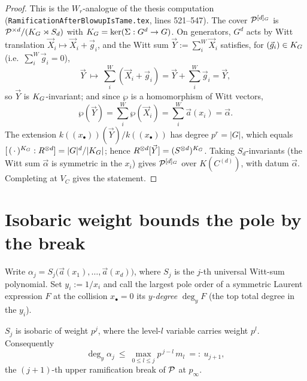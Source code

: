 \documentclass[11pt]{article}
\begin{document}
\begin{proof}
This is the $W_r$-analogue of the thesis computation
(\texttt{RamificationAfterBlowupIsTame.tex}, lines 521--547). The cover
$\mathcal{P}^{[d]_G}$ is $\mathcal{P}^{\times d}/(K_{G}\rtimes S_d)$ with
$K_{G}=\ker(\Sigma:G^d\to G)$. On generators, $G^d$ acts by Witt translation
$\vec X_i\mapsto \vec X_i+\vec g_i$, and the Witt sum $\vec Y:=\sum_i^{W}\vec X_i$
satisfies, for $(\vec g_i)\in K_{G}$ (i.e.\ $\sum_i^{W}\vec g_i=0$),
\[
\vec Y\ \longmapsto\ \sum_i^{W}(\vec X_i+\vec g_i)=\vec Y+\sum_i^{W}\vec g_i=\vec Y,
\]
so $\vec Y$ is $K_{G}$-invariant; and since $\wp$ is a homomorphism of Witt
vectors,
\[
\wp(\vec Y)=\sum_i^{W}\wp(\vec X_i)=\sum_i^{W}\vec a(x_i)=\vec\alpha .
\]
The extension $k((x_\bullet))(\vec Y)/k((x_\bullet))$ has degree $p^r=|G|$,
which equals $[\,(\,\cdot\,)^{K_{G}}:R^{\otimes d}]=|G|^d/|K_{G}|$; hence
$R^{\otimes d}[\vec Y]=(S^{\otimes d})^{K_{G}}$. Taking $S_d$-invariants (the Witt
sum $\vec\alpha$ is symmetric in the $x_i$) gives $\mathcal{P}^{[d]_G}$ over
$K(C^{(d)})$, with datum $\vec\alpha$. Completing at $V_C$ gives the statement.
\end{proof}

\section{Isobaric weight bounds the pole by the break}\label{sec:isobaric}

Write $\alpha_j=S_j\big(\vec a(x_1),\dots,\vec a(x_d)\big)$, where $S_j$ is the
$j$-th universal Witt-sum polynomial. Set $y_i:=1/x_i$ and call the largest pole
order of a symmetric Laurent expression $F$ at the collision $x_\bullet=0$ its
\emph{$y$-degree} $\deg_y F$ (the top total degree in the $y_i$).

\begin{lemma}\label{lem:isobaric}
$S_j$ is isobaric of weight $p^j$, where the level-$l$ variable carries weight
$p^l$. Consequently
\begin{equation}\label{eq:degbound}
\deg_y \alpha_j \ \le\ \max_{0\le l\le j} p^{\,j-l}\,m_l \ =:\ u_{j+1},
\end{equation}
the $(j{+}1)$-th upper ramification break of $\mathcal{P}$ at $p_\infty$.
\end{lemma}
\end{document}
